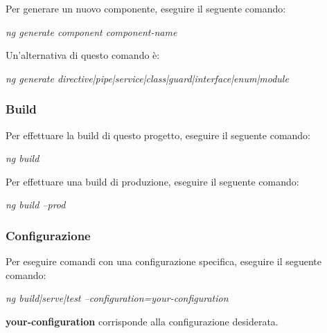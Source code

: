 \documentclass[../manuale-manutentore.tex]{subfiles}
\begin{document}
Per generare un nuovo componente, eseguire il seguente comando: \par\bigskip

\begin{center}
  \textit{ng generate component component-name}
\end{center}
\par\bigskip

Un'alternativa di questo comando è: \par\bigskip

\begin{center}
  \textit{ng generate directive|pipe|service|class|guard|interface|enum|module}
\end{center}
\par\bigskip

\subsubsection{Build}%
\label{subs:build}

Per effettuare la build di questo progetto, eseguire il seguente comando: \par\bigskip

\begin{center}
  \textit{ng build}
\end{center}
\par\bigskip

Per effettuare una build di produzione, eseguire il seguente comando: \par\bigskip

\begin{center}
  \textit{ng build --prod}
\end{center}
\par\bigskip

\subsubsection{Configurazione}%
\label{subs:configurazione}

Per eseguire comandi con una configurazione specifica, eseguire il seguente comando: \par\bigskip

\begin{center}
  \textit{ng build|serve|test --configuration=your-configuration}
\end{center}
\par\bigskip

\textbf{your-configuration} corrisponde alla configurazione desiderata.
\end{document}
